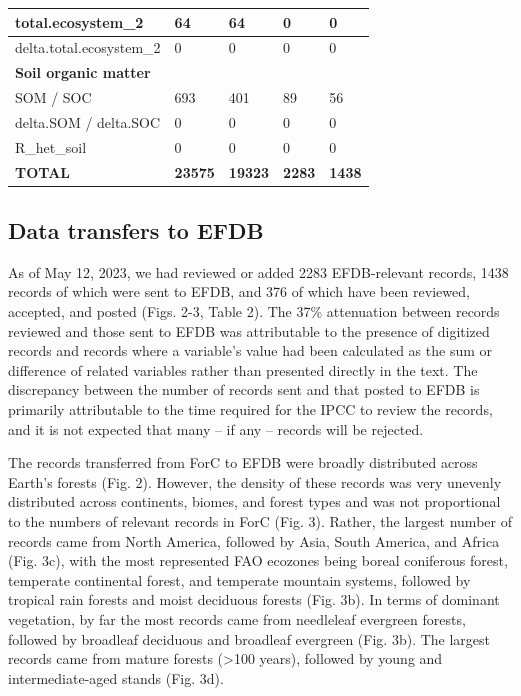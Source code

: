 \documentclass[, manuscript]{copernicus}
\begin{document}
\begin{longtable}[t]{l|l|l|l|l}
\hline
total.ecosystem\_2 & 64 & 64 & 0 & 0\\
\hline
delta.total.ecosystem\_2 & 0 & 0 & 0 & 0\\
\hline
\textbf{Soil organic matter} & \textbf{} & \textbf{} & \textbf{} & \textbf{}\\
\hline
SOM / SOC & 693 & 401 & 89 & 56\\
\hline
delta.SOM / delta.SOC & 0 & 0 & 0 & 0\\
\hline
R\_het\_soil & 0 & 0 & 0 & 0\\
\hline
\textbf{TOTAL} & \textbf{23575} & \textbf{19323} & \textbf{2283} & \textbf{1438}\\
\hline
\end{longtable}
\endgroup{}

\subsection{Data transfers to EFDB}

As of May 12, 2023, we had reviewed or added 2283 EFDB-relevant records,
1438 records of which were sent to EFDB, and 376 of which have been
reviewed, accepted, and posted (Figs. 2-3, Table 2). The 37\%
attenuation between records reviewed and those sent to EFDB was
attributable to the presence of digitized records and records where a
variable's value had been calculated as the sum or difference of related
variables rather than presented directly in the text. The discrepancy
between the number of records sent and that posted to EFDB is primarily
attributable to the time required for the IPCC to review the records,
and it is not expected that many -- if any -- records will be rejected.

The records transferred from ForC to EFDB were broadly distributed
across Earth's forests (Fig. 2). However, the density of these records
was very unevenly distributed across continents, biomes, and forest
types and was not proportional to the numbers of relevant records in
ForC (Fig. 3). Rather, the largest number of records came from North
America, followed by Asia, South America, and Africa (Fig. 3c), with the
most represented FAO ecozones being boreal coniferous forest, temperate
continental forest, and temperate mountain systems, followed by tropical
rain forests and moist deciduous forests (Fig. 3b). In terms of dominant
vegetation, by far the most records came from needleleaf evergreen
forests, followed by broadleaf deciduous and broadleaf evergreen (Fig.
3b). The largest records came from mature forests (\textgreater100
years), followed by young and intermediate-aged stands (Fig. 3d).
\end{document}
